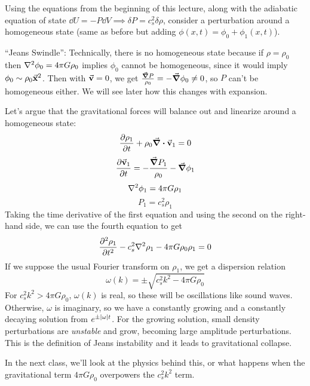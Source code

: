 \documentclass[a4paper,twoside,master.tex]{subfiles}
\begin{document}
Using the equations from the beginning of this lecture, along with the adiabatic equation of state $ \dd{U} = - P \dd{V} \implies \delta P = c_s^2 \delta \rho $, consider a perturbation around a homogeneous state (same as before but adding $ \phi(x,t) = \phi_0 + \phi_1(x,t) $).

``Jeans Swindle'': Technically, there is no homogeneous state because if $ \rho = \rho_0 $ then $ \laplacian{\phi_0} = 4 \pi G \rho_0 $ implies $ \phi_0 $ cannot be homogeneous, since it would imply $ \phi_0 \sim \rho_0 \va{x}^2 $. Then with $ \va{v} = 0 $, we get $ \frac{\grad{P}}{\rho_0} = - \grad{\phi_0} \neq 0 $, so $ P $ can't be homogeneous either. We will see later how this changes with expansion.

Let's argue that the gravitational forces will balance out and linearize around a homogeneous state:
\begin{equation}
    \pdv{\rho_1}{t} + \rho_0 \div{\va{v}_1} = 0
\end{equation}
\begin{equation}
    \pdv{\va{v}_1}{t} = - \frac{\grad{P_1}}{\rho_0} - \grad{\phi_1}
\end{equation}
\begin{equation}
    \laplacian{\phi_1} = 4 \pi G \rho_1
\end{equation}
\begin{equation}
    P_1 = c_s^2 \rho_1
\end{equation}
Taking the time derivative of the first equation and using the second on the right-hand side, we can use the fourth equation to get
\begin{equation}
    \pdv[2]{\rho_1}{t} - c_s^2 \laplacian{\rho_1} - 4 \pi G \rho_0 \rho_1 = 0
\end{equation}
If we suppose the usual Fourier transform on $ \rho_1 $, we get a dispersion relation
\begin{equation}
    \omega(k) = \pm \sqrt{c_s^2 k^2 - 4 \pi G \rho_0}
\end{equation}
For $ c_s^2 k^2 > 4 \pi G \rho_0 $, $ \omega(k) $ is real, so these will be oscillations like sound waves. Otherwise, $ \omega $ is imaginary, so we have a constantly growing and a constantly decaying solution from $ e^{\pm \abs{\omega} t} $. For the growing solution, small density perturbations are \textit{unstable} and grow, becoming large amplitude perturbations. This is the definition of Jeans instability and it leads to gravitational collapse.

In the next class, we'll look at the physics behind this, or what happens when the gravitational term $ 4 \pi G \rho_0 $ overpowers the $ c_s^2 k^2 $ term.
\end{document}
